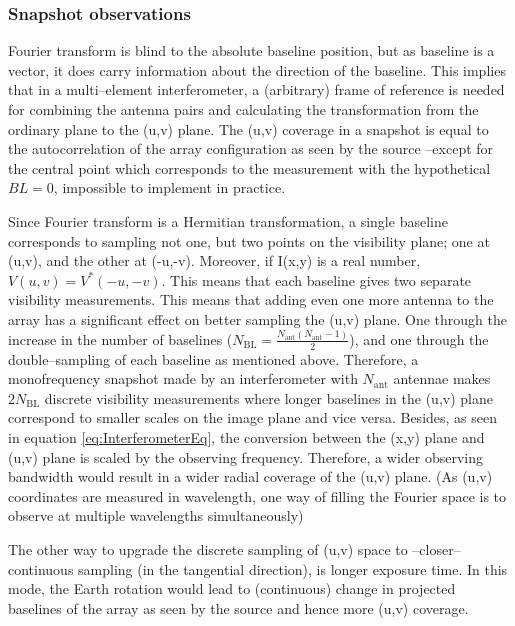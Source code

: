 \documentclass[paper=a4, fontsize=11pt]{scrartcl} %
\numberwithin{equation}{section} %
\numberwithin{figure}{section} %
\numberwithin{table}{section} %
\begin{document}
\subsubsection*{Snapshot observations}
Fourier transform is blind to the absolute baseline position, but as baseline is a vector, it does carry information about the direction of the baseline. This implies that in a multi--element interferometer, a (arbitrary) frame of reference is needed for combining the antenna pairs and calculating the transformation from the ordinary plane to the (u,v) plane. The (u,v) coverage in a snapshot is equal to the autocorrelation of the array configuration as seen by the source --except for the central point which corresponds to the measurement with the hypothetical $BL = 0$, impossible to implement in practice.



Since Fourier transform is a Hermitian transformation, a single baseline corresponds to sampling not one, but two points on the visibility plane; one at (u,v), and the other at (-u,-v). Moreover, if I(x,y) is a real number, $V(u,v) = V^*(-u,-v)$. This means that each baseline gives two separate visibility measurements. This means that adding even one more antenna to the array has a significant effect on better sampling the (u,v) plane. One through the increase in the number of baselines ($N_\mathrm{BL} = \frac{N_\mathrm{ant}(N_\mathrm{ant}-1)}{2}$), and one through the double--sampling of each baseline as mentioned above. Therefore, a monofrequency snapshot made by an interferometer with $N_\mathrm{ant}$ antennae makes $2N_\mathrm{BL}$ discrete visibility measurements where longer baselines in the (u,v) plane correspond to smaller scales on the image plane and vice versa. Besides, as seen in equation \ref{eq:InterferometerEq}, the conversion between the (x,y) plane and (u,v) plane is scaled by the observing frequency. Therefore, a wider observing bandwidth would result in a wider radial coverage of the (u,v) plane. (As (u,v) coordinates are measured in wavelength, one way of filling the Fourier space is to observe at multiple wavelengths simultaneously) 

The other way to upgrade the discrete sampling of (u,v) space to --closer-- continuous sampling (in the tangential direction), is longer exposure time. In this mode, the Earth rotation would lead to (continuous) change in projected baselines of the array as seen by the source and hence more (u,v) coverage.
\end{document}
